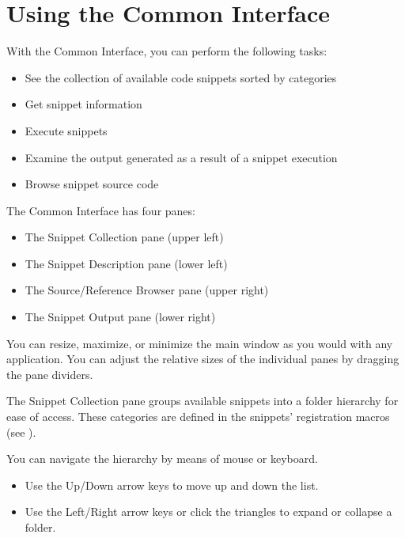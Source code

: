 \documentclass[letterpaper,12pt,english,openany,oneside]{sphinxmanual}
\begin{document}
\section{Using the Common Interface}
\label{\detokenize{Snippet_SnippetRunnerCookbook:using-the-common-interface}}
With the Common Interface, you can perform the following tasks:
\begin{itemize}
\item {} 
See the collection of available code snippets sorted by categories

\item {} 
Get snippet information

\item {} 
Execute snippets

\item {} 
Examine the output generated as a result of a snippet execution

\item {} 
Browse snippet source code

\end{itemize}

The Common Interface has four panes:
\begin{itemize}
\item {} 
The Snippet Collection pane (upper left)

\item {} 
The Snippet Description pane (lower left)

\item {} 
The Source/Reference Browser pane (upper right)

\item {} 
The Snippet Output pane (lower right)

\end{itemize}

You can resize, maximize, or minimize the main window as you would with any application. You can adjust the relative sizes of the individual panes by dragging the pane dividers.

The Snippet Collection pane groups available snippets into a folder hierarchy for ease of access. These categories are defined in the snippets’ registration macros (see ).

You can navigate the hierarchy by means of mouse or keyboard.
\begin{itemize}
\item {} 
Use the Up/Down arrow keys to move up and down the list.

\item {} 
Use the Left/Right arrow keys or click the triangles to expand or collapse a folder.

\end{itemize}
\end{document}
